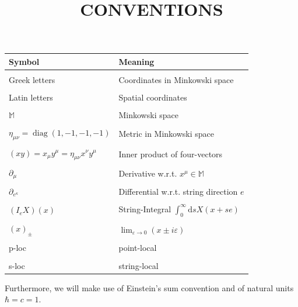 \documentclass[12pt,a4paper]{article}
\numberwithin{equation}{section}
\begin{document}
\newpage
\title{CONVENTIONS}
\maketitle
\begin{center}
\begin{tabular}{l|l} 
Symbol & Meaning \\
\hline \\ Greek letters & Coordinates in Minkowski space \\\\
Latin letters & Spatial coordinates \\\\
$\mathbb{M}$ & Minkowski space \\\\
$\eta_{\mu \nu}=\operatorname{diag}(1,-1,-1,-1)$ & Metric in Minkowski space \\\\
$(x y)=x_{\mu} y^{\mu}=\eta_{\mu \nu} x^{\nu} y^{\mu}$ & Inner product of four-vectors \\\\
$\partial_{\mu}$ & Derivative w.r.t. $x^{\mu} \in \mathbb{M}$ \\\\
$\partial_{e^{\kappa}}$ & Differential w.r.t. string direction $e$ \\\\
$\left(I_{e} X\right)(x)$ & String-Integral $\int_{0}^{\infty} \mathrm{d} s X(x+s e)$ \\\\
$(x)_{\pm}$ & $\lim _{\varepsilon \rightarrow 0}(x \pm i \varepsilon)$\\\\
p-loc & point-local\\\\
s-loc & string-local 
\end{tabular}
\end{center}
Furthermore, we will make use of Einstein’s sum convention
and of natural units $\hbar=c=1$.
\newpage

\tableofcontents

\newpage
\end{document}
